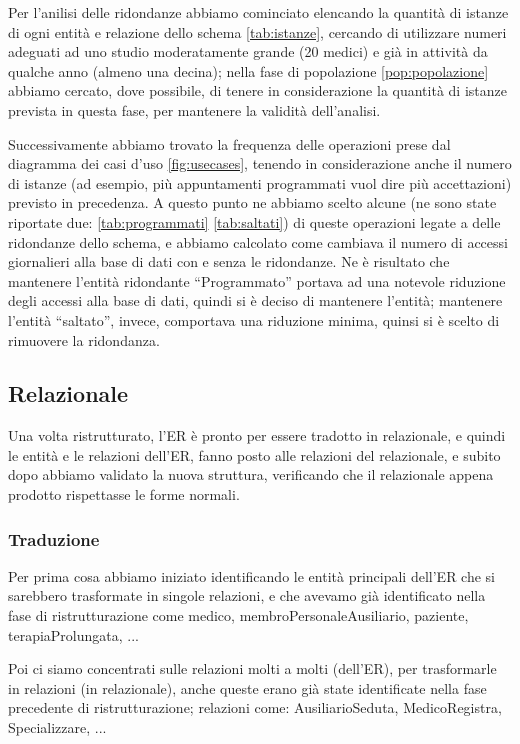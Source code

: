 \documentclass[11pt]{article}
\begin{document}
Per l'anilisi delle ridondanze abbiamo cominciato elencando la quantità di istanze di ogni entità e relazione dello schema \ref{tab:istanze}, cercando di utilizzare numeri adeguati ad uno studio moderatamente grande (20 medici) e già in attività da qualche anno (almeno una decina); nella fase di popolazione \ref{pop:popolazione} abbiamo cercato, dove possibile, di tenere in considerazione la quantità di istanze prevista in questa fase, per mantenere la validità dell'analisi.

Successivamente abbiamo trovato la frequenza delle operazioni prese dal diagramma dei casi d'uso \ref{fig:usecases}, tenendo in considerazione anche il numero di istanze (ad esempio, più appuntamenti programmati vuol dire più accettazioni) previsto in precedenza. A questo punto ne abbiamo scelto alcune (ne sono state riportate due: \ref{tab:programmati} \ref{tab:saltati}) di queste operazioni legate a delle ridondanze dello schema, e abbiamo calcolato come cambiava il numero di accessi giornalieri alla base di dati con e senza le ridondanze. Ne è risultato che mantenere l'entità ridondante ``Programmato'' portava ad una notevole riduzione degli accessi alla base di dati, quindi si è deciso di mantenere l'entità; mantenere l'entità ``saltato'', invece, comportava una riduzione minima, quinsi si è scelto di rimuovere la ridondanza.

\subsection{Relazionale}
Una volta ristrutturato, l'ER è pronto per essere tradotto in relazionale, e quindi le entità e le relazioni dell'ER, fanno posto alle relazioni del relazionale, e subito dopo abbiamo 
validato la nuova struttura, verificando che il relazionale appena prodotto rispettasse le forme normali.
\subsubsection{Traduzione}

Per prima cosa abbiamo iniziato identificando le entità principali dell'ER che si sarebbero trasformate in singole relazioni, e che avevamo già identificato nella fase di ristrutturazione come medico, membroPersonaleAusiliario, paziente, terapiaProlungata, ...

Poi ci siamo concentrati sulle relazioni molti a molti (dell'ER), per trasformarle in relazioni (in relazionale), anche queste erano già state identificate nella fase precedente di ristrutturazione; relazioni come: AusiliarioSeduta, MedicoRegistra, Specializzare, ...
\end{document}
